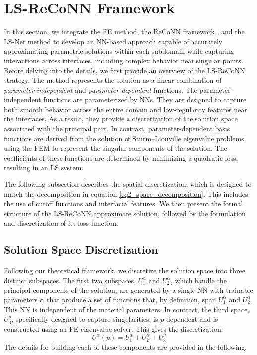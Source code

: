 \documentclass[oneside]{article}
\newcounter{reviewer}
\newcounter{point}[reviewer]
\begin{document}
\section{LS-ReCoNN Framework}\label{LS-ReCoNN Framework}
\noindent In this section, we integrate the FE method, the ReCoNN framework \cite{taylor2024regularity}, and the LS-Net method \cite{baharlouei2024least} to develop an NN-based approach capable of accurately approximating parametric solutions within each subdomain while capturing interactions across interfaces, including complex behavior near singular points. Before delving into the details, we first provide an overview of the LS-ReCoNN strategy. The method represents the solution as a linear combination of \emph{parameter-independent} and \emph{parameter-dependent} functions. The parameter-independent functions are parameterized by NNs. They are designed to capture both smooth behavior across the entire domain and low-regularity features near the interfaces. As a result, they provide a discretization of the solution space associated with the principal part. In contrast, parameter-dependent basis functions are derived from the solution of Sturm–Liouville eigenvalue problems using the FEM to represent the singular components of the solution. The coefficients of these functions are determined by minimizing a quadratic loss, resulting in an LS system.

\noindent The following subsection describes the spatial discretization, which is designed to match the decomposition in equation \eqref{eq2_space_decomposition}. This includes the use of cutoff functions and interfacial features. We then present the formal structure of the LS-ReCoNN approximate solution, followed by the formulation and discretization of its loss function.





\subsection{Solution Space Discretization}
Following our theoretical framework, we discretize the solution space into three distinct subspaces. The first two subspaces, $U_1^\alpha$ and $U_2^\alpha$, which handle the principal components of the solution, are generated by a single NN with trainable parameters $\alpha$ that produce a set of functions that, by definition, span $U_1^\alpha$ and $U_2^\alpha$. This NN is independent of the material parameters. In contrast, the third space, $U_3^p$, specifically designed to capture singularities, is $p$-dependent and is constructed using an FE eigenvalue solver. This gives the discretization:
\begin{equation}
U^\alpha(p) = U_1^\alpha + U_2^\alpha + U_3^p
\end{equation}
The details for building each of these components are provided in the following.
\end{document}
